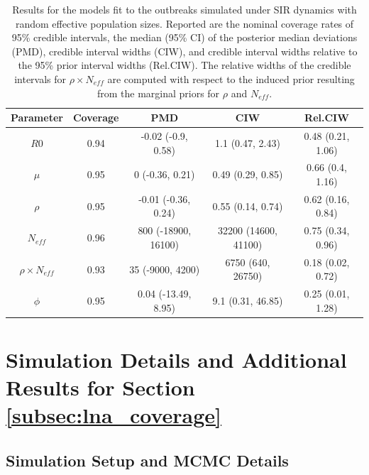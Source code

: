 \begin{table}[htbp]
	\caption[Coverage simulation results when estimating the effective population size]{Results for the models fit to the outbreaks simulated under SIR dynamics with random effective population sizes. Reported are the nominal coverage rates of 95\% credible intervals, the median (95\% CI) of the posterior median deviations (PMD), credible interval widths (CIW), and credible interval widths relative to the 95\% prior interval widths (Rel.CIW). The relative widths of the credible intervals for $ \rho\times N_{eff} $ are computed with respect to the induced prior resulting from the marginal priors for $ \rho $ and $ N_{eff} $.}
	\label{tab:effpop_coverage_results}
	\centering
	\small
	\begin{tabular}{ccccc}
		\hline
		\textbf{Parameter} & \textbf{Coverage} & \textbf{PMD} & \textbf{CIW} & \textbf{Rel.CIW} \\ 
		 \hline
		$ R0 $ & 0.94 & -0.02 (-0.9, 0.58) & 1.1 (0.47, 2.43) & 0.48 (0.21, 1.06) \\ 
		$ \mu $ & 0.95 & 0 (-0.36, 0.21) & 0.49 (0.29, 0.85) & 0.66 (0.4, 1.16) \\ 
		$ \rho $ & 0.95 & -0.01 (-0.36, 0.24) & 0.55 (0.14, 0.74) & 0.62 (0.16, 0.84) \\ 
		$ N_{eff} $ & 0.96 & 800 (-18900, 16100) & 32200 (14600, 41100) & 0.75 (0.34, 0.96) \\ 
		$ \rho\times N_{eff} $& 0.93 & 35 (-9000, 4200) & 6750 (640, 26750) & 0.18 (0.02, 0.72) \\ 
		$ \phi $ & 0.95 & 0.04 (-13.49, 8.95) & 9.1 (0.31, 46.85) & 0.25 (0.01, 1.28) \\ 
		\hline
	\end{tabular}
\end{table}

\newpage
\section{Simulation Details and Additional Results for Section \ref{subsec:lna_coverage}}
\label{sec:lna_coverage_supplement}

\subsection{Simulation Setup and MCMC Details}
\label{subsec:lna_coverage_setup_details}

